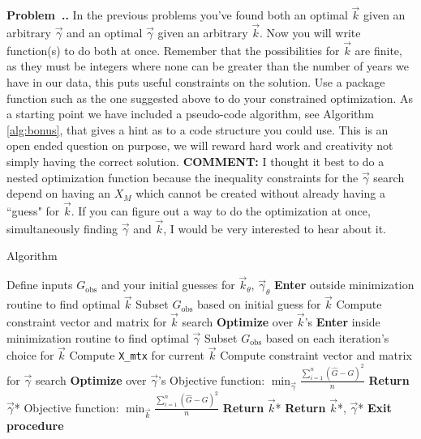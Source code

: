 \documentclass[11pt]{article}
\newcounter{prob} %
\newenvironment{prob}[1][]{\refstepcounter{prob}\par\noindent\smallskip
   \textbf{Problem~\thesection .\theprob. #1} \rmfamily}{\smallskip}
\begin{document}
\begin{prob}
In the previous problems you've found both an optimal $\vec{k}$ given an arbitrary $\vec{\gamma}$ and an optimal $\vec{\gamma}$ given an arbitrary $\vec{k}$. Now you will write function(s) to do both at once. Remember that the possibilities for $\vec{k}$ are finite, as they must be integers where none can be greater than the number of years we have in our data, this puts useful constraints on the solution. Use a package function such as the one suggested above to do your constrained optimization. As a starting point we have included a pseudo-code algorithm, see Algorithm \ref{alg:bonus}, that gives a hint as to a code structure you could use. This is an open ended question on purpose, we will reward hard work and creativity not simply having the correct solution.
\newline
\newline
\textbf{COMMENT:} I thought it best to do a nested optimization function because the inequality constraints for the $\vec{\gamma}$ search depend on having an $X_M$ which cannot be created without already having a ``guess" for $\vec{k}$. If you can figure out a way to do the optimization at once, simultaneously finding $\vec{\gamma}$ and $\vec{k}$, I would be very interested to hear about it.
\begin{algorithm}
\caption{Algorithm}
\label{alg:bonus}
\begin{algorithmic}[1]
 \State Define inputs $G_{\text{obs}}$ and your initial guesses for  $\vec{k}_\theta$, $\vec{\gamma}_\theta$
 \State \textbf{Enter} outside minimization routine to find optimal $\vec{k}$
 \Indent
   \State Subset $G_{\text{obs}}$ based on initial guess for $\vec{k}$
   \State Compute constraint vector and matrix for $\vec{k}$ search
   \Indent
     \State \textbf{Optimize} over $\vec{k}$'s
     \Indent
       \State \textbf{Enter} inside minimization routine to find optimal $\vec{\gamma}$
       \Indent
         \State Subset $G_{\text{obs}}$ based on each iteration's choice for $\vec{k}$
         \State Compute \texttt{X\_mtx} for current $\vec{k}$
         \State Compute constraint vector and matrix for $\vec{\gamma}$ search
         \State \textbf{Optimize} over $\vec{\gamma}$'s
         \Indent
           \State Objective function: $\min_{\vec{\gamma}} \frac{\sum_{i=1}^n(\hat{G} - G)^2}{n}$
         \EndIndent
         \State \textbf{Return} $\vec{\gamma}$*
       \EndIndent
       \State Objective function: $\min_{\vec{k}} \frac{\sum_{i=1}^n(\hat{G} - G)^2}{n}$
     \EndIndent
     \State \textbf{Return} $\vec{k}$*
   \EndIndent
 \EndIndent
 \State \textbf{Return} $\vec{k}$*, $\vec{\gamma}$*
 \State 	\textbf{Exit procedure}
 \EndProcedure
\end{algorithmic}
\end{algorithm}

\end{prob}
\end{document}
